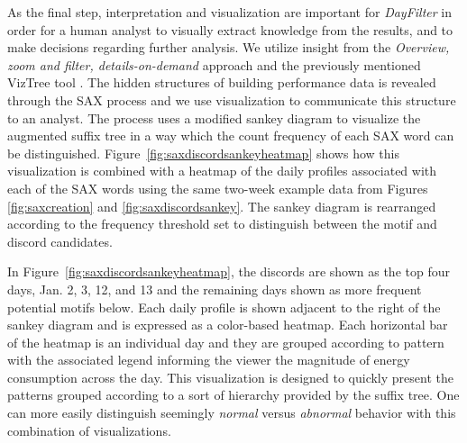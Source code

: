 As the final step, interpretation and visualization are important for \emph{DayFilter} in order for a human analyst to visually extract knowledge from the results, and to make decisions regarding further analysis. We utilize insight from the \emph{Overview, zoom and filter, details-on-demand} approach \cite{shneiderman_eyes_1996} and the previously mentioned VizTree tool \cite{lin_visually_2004}. The hidden structures of building performance data is revealed through the SAX process and we use visualization to communicate this structure to an analyst. The process uses a modified sankey diagram to visualize the augmented suffix tree in a way which the count frequency of each SAX word can be distinguished.  Figure~\ref{fig:saxdiscordsankeyheatmap} shows how this visualization is combined with a heatmap of the daily profiles associated with each of the SAX words using the same two-week example data from Figures \ref{fig:saxcreation} and \ref{fig:saxdiscordsankey}. The sankey diagram is rearranged according to the frequency threshold set to distinguish between the motif and discord candidates.

In Figure~\ref{fig:saxdiscordsankeyheatmap}, the discords are shown as the top four days, Jan. 2, 3, 12, and 13 and the remaining days shown as more frequent potential motifs below. Each daily profile is shown adjacent to the right of the sankey diagram and is expressed as a color-based heatmap. Each horizontal bar of the heatmap is an individual day and they are grouped according to pattern with the associated legend informing the viewer the magnitude of energy consumption across the day. This visualization is designed to quickly present the patterns grouped according to a sort of hierarchy provided by the suffix tree. One can more easily distinguish seemingly \emph{normal} versus \emph{abnormal} behavior with this combination of visualizations. 